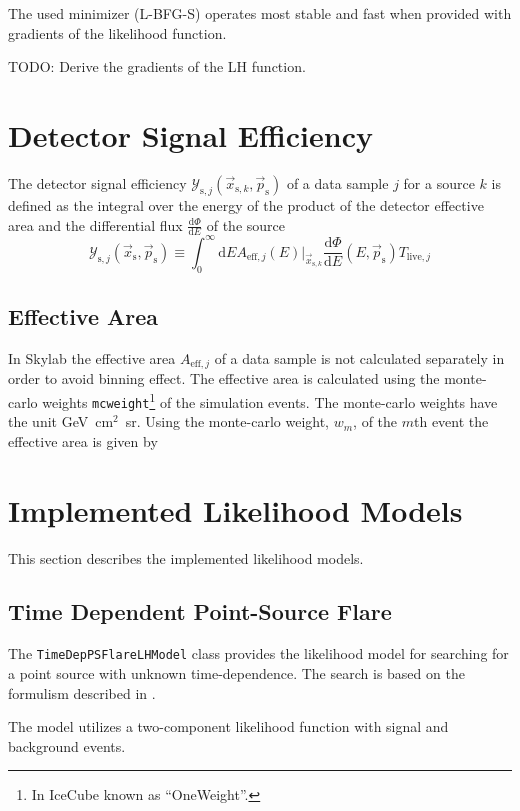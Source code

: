 \documentclass{article}
\newcommand{\code}[1]{\texttt{#1}}
\newcommand{\class}[1]{\colorbox{blue!30}{\code{#1}}}
\newcommand{\ps}{\vec{p}_{\mathrm{s}}}
\newcommand{\xs}{\vec{x}_{\mathrm{s}}}
\newcommand{\xsk}{\vec{x}_{\mathrm{s},k}}
\begin{document}
The used minimizer (L-BFG-S) operates most stable and fast when provided with
gradients of the likelihood function.

TODO: Derive the gradients of the LH function.

\section{Detector Signal Efficiency}

The detector signal efficiency $\mathcal{Y}_{\mathrm{s},j}(\vec{x}_{\mathrm{s},k},\ps)$
of a data sample $j$ for a source $k$ is defined as the integral over the energy
of the product of the detector effective area and the differential flux
$\frac{\mathrm{d}\Phi}{\mathrm{d}E}$ of the source
\begin{equation}
 \mathcal{Y}_{\mathrm{s},j}(\xs,\ps) \equiv \int_0^\infty \mathrm{d}E A_{\mathrm{eff},j}(E)|_{\xsk} \frac{\mathrm{d}\Phi}{\mathrm{d}E}(E,\ps) T_{\mathrm{live},j}
\end{equation}

\subsection{Effective Area}

In Skylab the effective area $A_{\mathrm{eff},j}$ of a data sample is not
calculated separately in order to avoid binning effect. The effective area is
calculated using the monte-carlo weights \code{mcweight}\footnote{In IceCube
known as ``OneWeight''.} of the simulation events.
The monte-carlo weights have the unit GeV~cm$^2$~sr.
Using the monte-carlo weight, $w_m$, of the $m$th event the effective
area is given by





\section{Implemented Likelihood Models}
This section describes the implemented likelihood models.

\subsection{Time Dependent Point-Source Flare}

The \class{TimeDepPSFlareLHModel} class provides the likelihood model for searching for a point source with unknown time-dependence.
The search is based on the formulism described in \cite{TimeDepPSSearchMethods2010}.

The model utilizes a two-component likelihood function with signal and background events.



\end{document}
